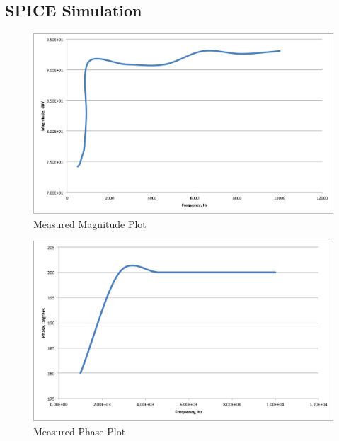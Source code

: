\documentclass[11pt, twoside, letterpaper]{article}
\begin{document}
\subsection{SPICE Simulation}
\begin{figure}
\begin{center}
\includegraphics[width=7in]{measuredmag.png}
\caption{Measured Magnitude Plot}
\end{center}
\end{figure}

\begin{figure}[htbp]
\begin{center}
\includegraphics[width=7in]{measuredphase.png}
\caption{Measured Phase Plot}
\end{center}
\end{figure}
\FloatBarrier
\end{document}
